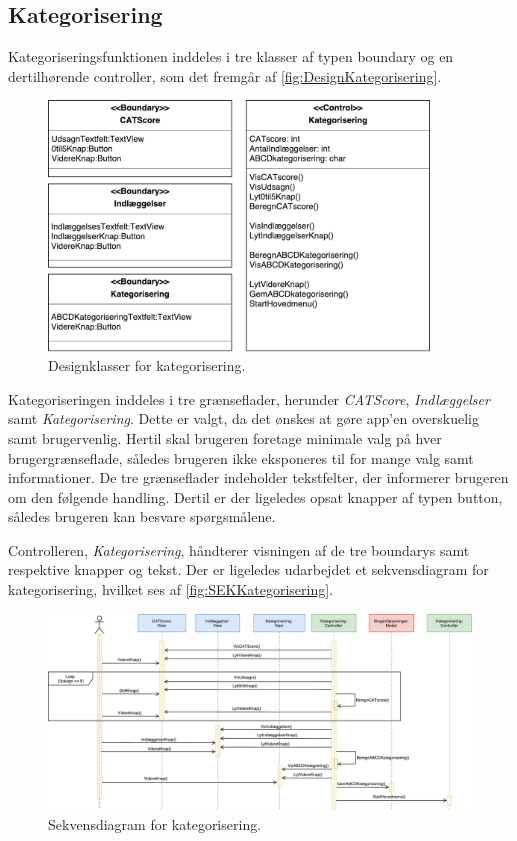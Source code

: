 \subsection*{Kategorisering}
Kategoriseringsfunktionen inddeles i tre klasser af typen boundary og en dertilhørende controller, som det fremgår af \autoref{fig:DesignKategorisering}.

\begin{figure} [H]
\centering
\includegraphics[width=0.9\textwidth]{figures/MVC/MVCKategorisering}
\caption{Designklasser for kategorisering.}
\label{fig:DesignKategorisering}
\end{figure}

\noindent
Kategoriseringen inddeles i tre grænseflader, herunder \textit{CATScore}, \textit{Indlæggelser} samt \textit{Kategorisering}. Dette er valgt, da det ønskes at gøre app’en overskuelig samt
brugervenlig. Hertil skal brugeren foretage minimale valg på hver brugergrænseflade, således
brugeren ikke eksponeres til for mange valg samt informationer. De tre grænseflader indeholder tekstfelter, der informerer brugeren om den følgende handling. Dertil er der ligeledes opsat knapper af typen button, således brugeren kan besvare spørgsmålene. 

Controlleren, \textit{Kategorisering}, håndterer visningen af de tre boundarys samt respektive knapper og tekst. Der er ligeledes udarbejdet et sekvensdiagram for kategorisering, hvilket ses af \autoref{fig:SEKKategorisering}.

\begin{figure} [H]
\centering
\includegraphics[width=1\textwidth]{figures/Sek/SEKKategorisering}
\caption{Sekvensdiagram for kategorisering.}
\label{fig:SEKKategorisering}
\end{figure}

